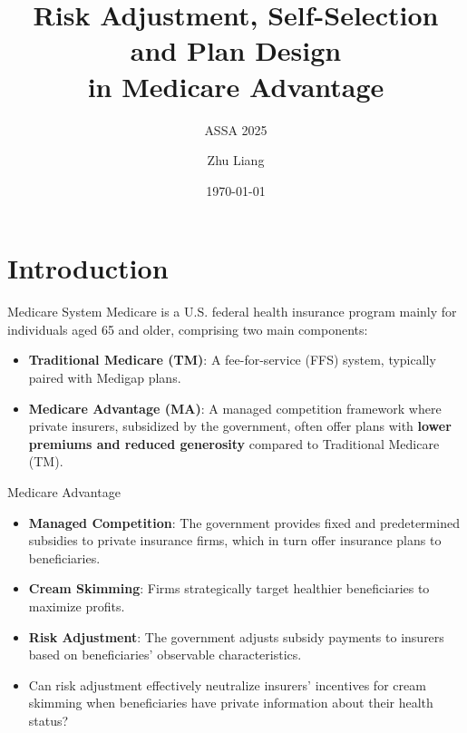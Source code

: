 \documentclass[professionalfonts, aspectratio=169]{beamer}
\title{Risk Adjustment, Self-Selection and Plan Design \\ in Medicare Advantage}
\subtitle{ASSA 2025}
\institute{Stony Brook University}
\author{Zhu Liang}
\date{\today}
\begin{document}

\begin{frame} %
    \titlepage
\end{frame}

\section{Introduction}

\begin{frame}{Medicare System}
  Medicare is a U.S. federal health insurance program mainly for individuals aged 65 and older, comprising two main components:
  \begin{itemize}
    \item \textbf{Traditional Medicare (TM)}: A fee-for-service (FFS) system, typically paired with Medigap plans.
    \item \textbf{Medicare Advantage (MA)}: A managed competition framework where private insurers, subsidized by the government, often offer plans with \textbf{lower premiums and reduced generosity} compared to Traditional Medicare (TM).
  \end{itemize}
\end{frame}

\begin{frame}{Medicare Advantage}
  \begin{itemize}
    \item \textbf{Managed Competition}: The government provides fixed and predetermined subsidies to private insurance firms, which in turn offer insurance plans to beneficiaries.
    \item \textbf{Cream Skimming}: Firms strategically target healthier beneficiaries to maximize profits.
    \item \textbf{Risk Adjustment}: The government adjusts subsidy payments to insurers based on beneficiaries' observable characteristics.
    \item Can risk adjustment effectively neutralize insurers' incentives for cream skimming when beneficiaries have private information about their health status?
  \end{itemize}
\end{frame}
\end{document}
